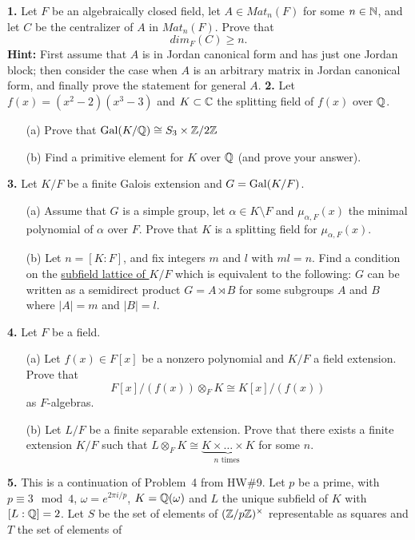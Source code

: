 \documentclass[12pt]{article}
\begin{document}
\skv
{\bf 1.} Let $F$ be an algebraically closed field, let $A\in Mat_n (F)$
for some $n\in{\mathbb N}$, and let $C$ be the centralizer of $A$ in $Mat_n (F)$.
Prove that $$dim_F(C)\geq n.$$ {\bf Hint:} First assume that $A$ is in Jordan
canonical form and has just one Jordan block; then consider the case when
$A$ is an arbitrary matrix in Jordan canonical form, and finally prove
the statement for general $A$.
\skv
{\bf 2.} Let $f(x)=(x^2-2)(x^3-3)$ and $K\subset{\mathbb C}$ the splitting field of $f(x)$
over ${\mathbb Q}$.
\begin{itemize}
\item[(a)] Prove that ${\rm Gal}(K/{\mathbb Q})\cong S_3\times {\mathbb Z}/2{\mathbb Z}$
\item[(b)] Find a primitive element for $K$ over ${\mathbb Q}$ (and prove
your answer).
\end{itemize}
\skv
{\bf 3.} Let $K/F$ be a finite Galois extension and $G={\rm Gal}(K/F)$.
\begin{itemize}
\item[(a)] Assume  that $G$ is a simple group, let $\alpha\in K\setminus F$
and $\mu_{\alpha,F}(x)$ the minimal polynomial of $\alpha$ over $F$.
Prove that $K$ is a splitting field for $\mu_{\alpha,F}(x)$.

\item[(b)] Let $n=[K:F]$, and fix integers $m$ and $l$ with $ml=n$.
Find a condition on the \underline{subfield lattice of $K/F$} which is equivalent
to the following: $G$ can be written as a semidirect product $G=A\rtimes B$
for some subgroups $A$ and $B$ where $|A|=m$ and $|B|=l$.
\end{itemize}
\skv
{\bf 4.} Let $F$ be a field.
\begin{itemize}
\item[(a)] Let $f(x)\in F[x]$ be a nonzero polynomial and $K/F$ a field extension.
Prove that $$F[x]/(f(x))\otimes_F K\cong K[x]/(f(x))$$ as $F$-algebras.
\item[(b)] Let $L/F$ be a finite separable extension. Prove that
there exists a finite extension $K/F$ such that 
$L\otimes_F K\cong \underbrace{K\times\ldots\times K}_{n \mbox{ times }}$
for some $n$.
\end{itemize}
\skv
{\bf 5.} This is a continuation of Problem~4 from HW\#9.
Let $p$ be a prime, with $p\equiv 3\mod 4$, $\omega=e^{2\pi i/p}$, $K={\mathbb Q}(\omega)$ and $L$ the unique subfield of $K$ with $[L:{\mathbb Q}]=2$. 
Let $S$ be the set of elements of $({\mathbb Z}/p{\mathbb Z})^{\times}$ 
representable as squares and $T$ the set of elements of 
\end{document}
